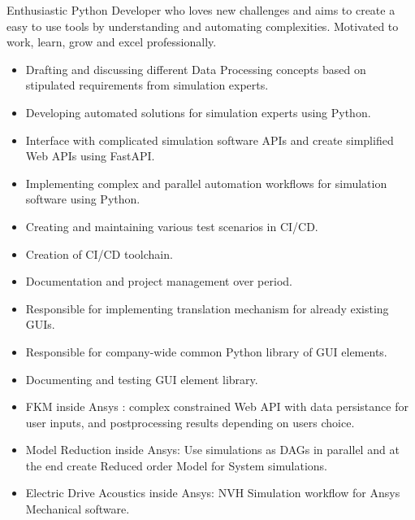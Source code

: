 \documentclass[10pt,a4paper,ragged2e,withhyper]{altacv}
\begin{document}
\begin{paracol}{2}

\begin{flushleft}
Enthusiastic Python Developer who loves new challenges and aims to create a easy to use tools by understanding and automating complexities. 
Motivated to work, learn, grow and excel professionally.
\end{flushleft}

\begin{itemize}
\item Drafting and discussing different Data Processing concepts based on stipulated requirements from simulation experts.
\item Developing automated solutions for simulation experts using Python.
\item Interface with complicated simulation software APIs and create simplified Web APIs using FastAPI.
\item Implementing complex and parallel automation  workflows for simulation software using Python.
\item Creating and maintaining various test scenarios in CI/CD.
\item Creation of  CI/CD toolchain.
\item Documentation and project management over period. 
\end{itemize}
\divider
{}
\begin{itemize}
\item Responsible for implementing translation mechanism for already existing GUIs. 
\item Responsible for company-wide common Python library of GUI elements.
\item Documenting and testing GUI element library.
\end{itemize}
\divider

\begin{itemize}

\item FKM inside Ansys : complex constrained Web API with data persistance for user inputs, and postprocessing results depending on users choice. 
\item Model Reduction inside Ansys: Use simulations as DAGs in parallel and at the end create Reduced order Model for System simulations.
\item Electric Drive Acoustics inside Ansys: NVH Simulation workflow for Ansys Mechanical software.
\end{itemize}


\end{paracol}
\end{document}
